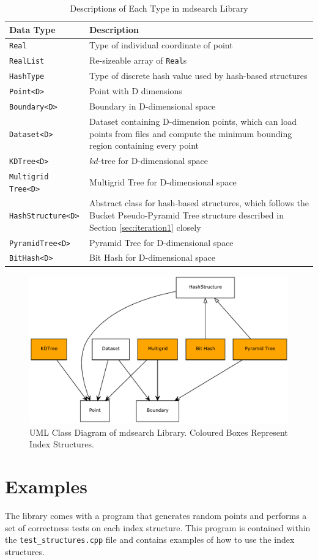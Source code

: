 \begin{table}[h]
	\centering
	\begin{tabular}{|p{4.25cm}|p{9.5cm}|}
		\hline
		\textbf{Data Type} & \textbf{Description} \\
		\hline
		\texttt{Real} & Type of individual coordinate of point \\
		\texttt{RealList} & Re-sizeable array of \texttt{Real}s \\
		\texttt{HashType} & Type of discrete hash value used by hash-based structures \\
		\texttt{Point<D>} & Point with D dimensions \\
		\texttt{Boundary<D>} & Boundary in D-dimensional space \\
		\texttt{Dataset<D>} & Dataset containing D-dimension points, which can load points from files and compute the minimum bounding region containing every point \\
		\texttt{KDTree<D>} & $kd$-tree for D-dimensional space \\
		\texttt{Multigrid Tree<D>} & Multigrid Tree for D-dimensional space \\
		\texttt{HashStructure<D>} & Abstract class for hash-based structures, which follows the Bucket Pseudo-Pyramid Tree structure described in Section \ref{sec:iteration1} closely \\
		\texttt{PyramidTree<D>} & Pyramid Tree for D-dimensional space \\
		\texttt{BitHash<D>} & Bit Hash for D-dimensional space \\
		\hline
	\end{tabular}
	\caption{Descriptions of Each Type in mdsearch Library}
	\label{tab:library-classes}
\end{table}

\begin{figure}[h]
	\centering
	\includegraphics[scale=0.6]{figures/mdsearch_classes_uml.pdf}
	\caption{UML Class Diagram of mdsearch Library. Coloured Boxes Represent Index Structures.}
	\label{fig:library-class-diagram} 
\end{figure}

\section{Examples}

The library comes with a program that generates random points and performs a set of correctness tests on each index structure. This program is contained within the \texttt{test\_structures.cpp} file and contains examples of how to use the index structures.